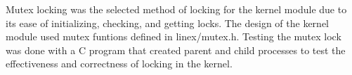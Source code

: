 \documentclass[12pt]{article}
\begin{document}
 \begin{FlushLeft}
 	\begin{spacing}{2}
	Mutex locking was the selected method of locking for the kernel module due to its ease of initializing, checking, and getting locks. The design of the kernel module used mutex funtions defined in linex/mutex.h. Testing the mutex lock was done with a C program that created parent and child processes to test the effectiveness and correctness of locking in the kernel. 
	\end{spacing}
 \end{FlushLeft}

 
\end{document}
